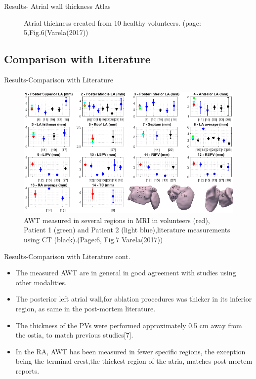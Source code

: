 \documentclass[aspectratio=43]{beamer}
\begin{document}
\begin{frame}{Results- Atrial wall thickness Atlas}
\begin{minipage}{0.4\textwidth}
\begin{figure}[h!]
\caption {Atrial thickness created from 10 healthy volunteers. (page: 5,Fig.6(Varela(2017)) }
\end{figure}
\end{minipage}

\noindent



\end{frame}

\newpage


\subsection{Comparison with Literature}
\begin{frame}{Results-Comparison with Literature}
\begin{minipage}{0.88\textwidth}
\begin{figure}[h!]
\includegraphics[width=\linewidth]{img/img8}\centering 
\caption{\scriptsize AWT measured in several regions in MRI in volunteers (red), Patient 1 (green) and Patient 2 (light blue),literature measurements using CT (black).(Page:6, Fig.7 Varela(2017)) }

\end{figure}
\end{minipage}

\end{frame}

\newpage

\begin{frame}{Results-Comparison with Literature cont.}
\begin{itemize}
\item The measured AWT are in general in good agreement with studies using other modalities.
\item The posterior left atrial wall,for ablation procedures was thicker in its inferior region, as same in the post-mortem literature.
\item The thickness of the PVs were performed approximately 0.5 cm away from the ostia, to match previous studies[7]. 
\item In the RA, AWT has been measured in fewer specific regions, the exception being the terminal crest,the thickest region of the atria, matches post-mortem reports.

\end{itemize}
\end{frame}
\end{document}
